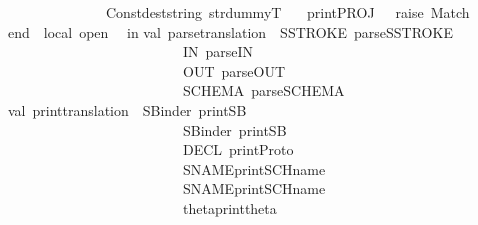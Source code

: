 \begin{isabellebody}
\ \ \ \ \ \ \ \ \ \ \ \ \ \ Const{\isacharparenleft}dest{\isacharunderscore}string\ str{\isacharcomma}dummyT{\isacharparenright}\isanewline
\ \ \ {\isacharbar}print{\isacharunderscore}PROJ\ {\isacharunderscore}\ {\isacharequal}\ raise\ Match\isanewline
\ \ \isanewline
end\ {\isacharparenleft}{\isacharasterisk}\ local\ open\ {\isacharasterisk}{\isacharparenright}\ \isanewline
\isanewline
in\isanewline
\isanewline
val\ parse{\isacharunderscore}translation\ {\isacharequal}\ {\isacharbrackleft}{\isacharparenleft}{\isachardoublequote}SSTROKE{\isachardoublequote}{\isacharcomma}\ parse{\isacharunderscore}SSTROKE{\isacharparenright}{\isacharcomma}\isanewline
\ \ \ \ \ \ \ \ \ \ \ \ \ \ \ \ \ \ \ \ \ \ \ \ \ {\isacharparenleft}{\isachardoublequote}{\isacharunderscore}IN{\isachardoublequote}{\isacharcomma}\ parse{\isacharunderscore}IN{\isacharparenright}{\isacharcomma}\isanewline
\ \ \ \ \ \ \ \ \ \ \ \ \ \ \ \ \ \ \ \ \ \ \ \ \ {\isacharparenleft}{\isachardoublequote}{\isacharunderscore}OUT{\isachardoublequote}{\isacharcomma}\ parse{\isacharunderscore}OUT{\isacharparenright}{\isacharcomma}\isanewline
\ \ \ \ \ \ \ \ \ \ \ \ \ \ \ \ \ \ \ \ \ \ \ \ \ {\isacharparenleft}{\isachardoublequote}SCHEMA{\isachardoublequote}{\isacharcomma}\ parse{\isacharunderscore}SCHEMA{\isacharparenright}{\isacharbrackright}{\isacharsemicolon}\isanewline
val\ print{\isacharunderscore}translation\ {\isacharequal}\ {\isacharbrackleft}{\isacharparenleft}{\isachardoublequote}SBinder{}{\isachardoublequote}{\isacharcomma}\ print{\isacharunderscore}SB{}{\isacharparenright}{\isacharcomma}\isanewline
\ \ \ \ \ \ \ \ \ \ \ \ \ \ \ \ \ \ \ \ \ \ \ \ \ {\isacharparenleft}{\isachardoublequote}SBinder{\isachardoublequote}{\isacharcomma}\ print{\isacharunderscore}SB{\isacharparenright}{\isacharcomma}\isanewline
\ \ \ \ \ \ \ \ \ \ \ \ \ \ \ \ \ \ \ \ \ \ \ \ \ {\isacharparenleft}{\isachardoublequote}DECL{\isachardoublequote}{\isacharcomma}\ print{\isacharunderscore}Proto{\isacharparenright}{\isacharcomma}\isanewline
\ \ \ \ \ \ \ \ \ \ \ \ \ \ \ \ \ \ \ \ \ \ \ \ \ {\isacharparenleft}{\isachardoublequote}SNAME{}{\isachardoublequote}{\isacharcomma}print{\isacharunderscore}SCH{\isacharunderscore}name{}{\isacharparenright}{\isacharcomma}\ \isanewline
\ \ \ \ \ \ \ \ \ \ \ \ \ \ \ \ \ \ \ \ \ \ \ \ \ {\isacharparenleft}{\isachardoublequote}SNAME{\isachardoublequote}{\isacharcomma}print{\isacharunderscore}SCH{\isacharunderscore}name{\isacharparenright}{\isacharcomma}\isanewline
\ \ \ \ \ \ \ \ \ \ \ \ \ \ \ \ \ \ \ \ \ \ \ \ \ {\isacharparenleft}{\isachardoublequote}theta{\isachardoublequote}{\isacharcomma}print{\isacharunderscore}theta{\isacharparenright}{\isacharcomma}\isanewline

\end{isabellebody}
